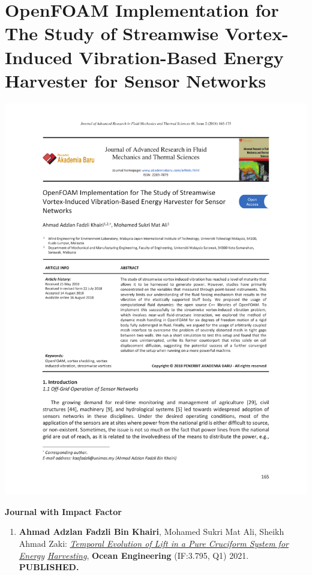\documentclass[oneside]{utmthesis}
\begin{document}
\chapter{OpenFOAM Implementation for The Study of Streamwise Vortex-Induced Vibration-Based Energy Harvester for Sensor Networks}
\begin{center}
  \includegraphics[width=1\textwidth]{figs/appendix_SCOPUS}
\end{center}

\listofpublications

\noindent \textbf{Journal with Impact Factor}
\begin{enumerate}
  \item  \textbf{Ahmad Adzlan Fadzli Bin Khairi}, Mohamed Sukri Mat Ali, Sheikh Ahmad Zaki: \textit{\underline{Temporal Evolution of Lift in a Pure Cruciform System for Energy} \underline{Harvesting}}, \textbf{Ocean Engineering} (IF:3.795, Q1) 2021. \textbf{PUBLISHED.}
\end{enumerate}
\end{document}
